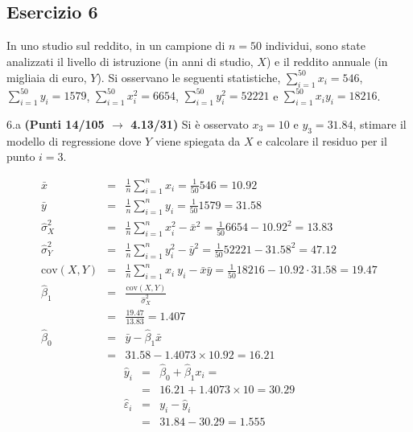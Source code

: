 \documentclass[
  11pt,
]{book}
\theoremstyle{mytheoremstyle}
\theoremstyle{mydefstyle}
\newenvironment{sol}
  {
  \begin{tcolorbox}[enhanced,breakable,arc=0.1mm,boxrule=1pt,colback=white,colframe=iblue,
  title=\bf \fontfamily{lmss}\selectfont \hspace{.5 cm} Soluzione,drop fuzzy shadow]

}{
\end{tcolorbox}
  }
\begin{document}
\subsection{Esercizio 6}\label{esercizio-6-29}

In uno studio sul reddito, in un campione di \(n=50\) individui, sono state analizzati il livello di istruzione (in anni di studio, \(X\)) e il reddito annuale (in migliaia di euro, \(Y\)).
Si osservano le seguenti statistiche, \(\sum_{i=1}^{50}x_i=546\), \(\sum_{i=1}^{50}y_i=1579\),
\(\sum_{i=1}^{50}x_i^2=6654\), \(\sum_{i=1}^{50}y_i^2=52221\) e \(\sum_{i=1}^{50}x_iy_i=18216\).

6.a \textbf{(Punti 14/105 \(\rightarrow\) 4.13/31)} Si è osservato \(x_3=10\) e \(y_3=31.84\), stimare il modello di regressione dove \(Y\) viene spiegata da \(X\) e calcolare il residuo per il punto \(i=3\).

\begin{sol}
\begin{eqnarray*}
           \bar x &=&\frac 1 n\sum_{i=1}^n x_i = \frac {1}{ 50 }  546 =  10.92 \\
           \bar y &=&\frac 1 n\sum_{i=1}^n y_i = \frac {1}{ 50 }  1579 =  31.58 \\
           \hat\sigma_X^2&=&\frac 1 n\sum_{i=1}^n x_i^2-\bar x^2=\frac {1}{ 50 }  6654  - 10.92 ^2= 13.83 \\
           \hat\sigma_Y^2&=&\frac 1 n\sum_{i=1}^n y_i^2-\bar y^2=\frac {1}{ 50 }  52221  - 31.58 ^2= 47.12 \\
           \text{cov}(X,Y)&=&\frac 1 n\sum_{i=1}^n x_i~y_i-\bar x\bar y=\frac {1}{ 50 }  18216 - 10.92 \cdot 31.58 = 19.47 \\
           \hat\beta_1 &=& \frac{\text{cov}(X,Y)}{\hat\sigma_X^2} \\
                    &=& \frac{ 19.47 }{ 13.83 }  =  1.407 \\
           \hat\beta_0 &=& \bar y - \hat\beta_1 \bar x\\
                    &=&  31.58 - 1.4073 \times  10.92 = 16.21 
         \end{eqnarray*}\begin{eqnarray*}
\hat y_i &=&\hat\beta_0+\hat\beta_1 x_i=\\ 
&=& 16.21 + 1.4073 \times 10 = 30.29 \\ 
\hat \varepsilon_i &=& y_i-\hat y_i\\ 
&=& 31.84 - 30.29 = 1.555  
\end{eqnarray*}

\end{sol}
\end{document}
